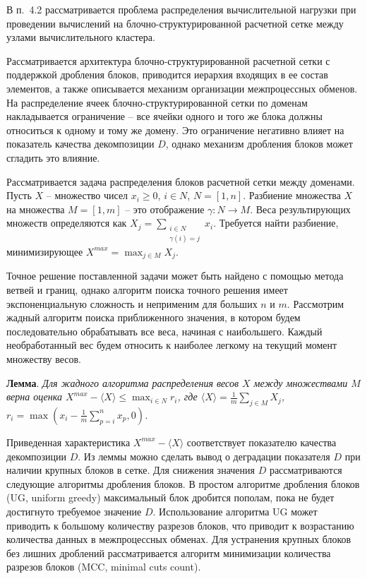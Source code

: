 \documentclass[a4paper,14pt]{extarticle}                     %
\theoremstyle{plain}                                         %
\begin{document}

В п.~4.2 рассматривается проблема распределения вычислительной нагрузки при проведении вычислений на блочно-структурированной расчетной сетке между узлами вычислительного кластера.

Рассматривается архитектура блочно-структурированной расчетной сетки с поддержкой дробления блоков, приводится иерархия входящих в ее состав элементов, а также описывается механизм организации межпроцессных обменов.
На распределение ячеек блочно-структурированной сетки по доменам накладывается ограничение -- все ячейки одного и того же блока должны относиться к одному и тому же домену.
Это ограничение негативно влияет на показатель качества декомпозиции $D$, однако механизм дробления блоков может сгладить это влияние.

Рассматривается задача распределения блоков расчетной сетки между доменами.
Пусть $X$ -- множество чисел $x_i \ge 0$, $i \in N$, $N = [1, n]$.
Разбиение множества $X$ на множества $M = [1, m]$ -- это отображение $\gamma: N \rightarrow M$.
Веса результирующих множеств определяются как $X_j = \sum_{\substack{i \in N \\ \gamma(i) = j}}{x_i}$.
Требуется найти разбиение, минимизирующее $X^{max} = \max_{j \in M}{X_j}$.

Точное решение поставленной задачи может быть найдено с помощью метода ветвей и границ, однако алгоритм поиска точного решения имеет экспоненциальную сложность и неприменим для больших $n$ и $m$.
Рассмотрим жадный алгоритм поиска приближенного значения, в котором будем последовательно обрабатывать все веса, начиная с наибольшего.
Каждый необработанный вес будем относить к наиболее легкому на текущий момент множеству весов.

\textbf{Лемма}. \textit{Для жадного алгоритма распределения весов $X$ между множествами $M$ верна оценка $X^{max} - \langle X \rangle \le \max_{i \in N}{r_i}$, где $\langle X \rangle = \frac{1}{m}\sum_{j \in M}{X_j}$, $r_i = \max{\left( x_i - \frac{1}{m} \sum_{p = i}^{n}{x_p}, 0 \right)}$.}

Приведенная характеристика $X^{max} - \langle X \rangle$ соответствует показателю качества декомпозиции $D$.
Из леммы можно сделать вывод о деградации показателя $D$ при наличии крупных блоков в сетке.
Для снижения значения $D$ рассматриваются следующие алгоритмы дробления блоков.
В простом алгоритме дробления блоков (UG, uniform greedy) максимальный блок дробится пополам, пока не будет достигнуто требуемое значение $D$.
Использование алгоритма UG может приводить к большому количеству разрезов блоков, что приводит к возрастанию количества данных в межпроцессных обменах.
Для устранения крупных блоков без лишних дроблений рассматривается алгоритм минимизации количества разрезов блоков (MCC, minimal cuts count).
\end{document}
